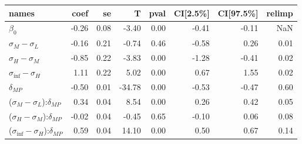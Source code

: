 \begin{tabular}{lrrrrrrr}
\toprule
                                       names &  coef &   se &      T &  pval &  CI[2.5\%] &  CI[97.5\%] &  relimp \\
\midrule
                                 $\beta_{0}$ & -0.26 & 0.08 &  -3.40 &  0.00 &      -0.41 &       -0.11 &     NaN \\
                   $\sigma_{M} - \sigma_{L}$ & -0.16 & 0.21 &  -0.74 &  0.46 &      -0.58 &        0.26 &    0.01 \\
                   $\sigma_{H} - \sigma_{M}$ & -0.85 & 0.22 &  -3.83 &  0.00 &      -1.28 &       -0.41 &    0.02 \\
                $\sigma_{\inf} - \sigma_{H}$ &  1.11 & 0.22 &   5.02 &  0.00 &       0.67 &        1.55 &    0.02 \\
                               $\delta_{MP}$ & -0.50 & 0.01 & -34.78 &  0.00 &      -0.53 &       -0.47 &    0.60 \\
   ($\sigma_{M} - \sigma_{L}$):$\delta_{MP}$ &  0.34 & 0.04 &   8.54 &  0.00 &       0.26 &        0.42 &    0.05 \\
   ($\sigma_{H} - \sigma_{M}$):$\delta_{MP}$ & -0.02 & 0.04 &  -0.45 &  0.65 &      -0.10 &        0.06 &    0.08 \\
($\sigma_{\inf} - \sigma_{H}$):$\delta_{MP}$ &  0.59 & 0.04 &  14.10 &  0.00 &       0.50 &        0.67 &    0.14 \\
\bottomrule
\end{tabular}
